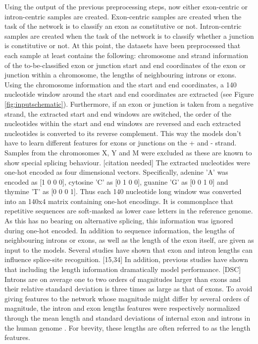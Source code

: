 Using the output of the previous preprocessing steps, now either exon-centric or intron-centric samples are created. Exon-centric samples are created when the task of the network is to classify an exon as constitutive or not. Intron-centric samples are created when the task of the network is to classify whether a junction is constitutive or not.
At this point, the datasets have been preprocessed that each sample at least contains the following:
chromosome and strand information of the to-be-classified exon or junction
start and end coordinates of the exon or junction within a chromosome,
the lengths of neighbouring introns or exons.
Using the chromosome information and the start and end coordinates, a 140 nucleotide window around the start and end coordinates are extracted (see Figure \ref{fig:inputschematic}). Furthermore, if an exon or junction is taken from a negative strand, the extracted start and end windows are switched, the order of the nucleotides within the start and end windows are reversed and each extracted nucleotides is converted to its reverse complement. This way the models don't have to learn different features for exons or junctions on the + and - strand.
Samples from the chromosomes X, Y and M were excluded as these are known to show special splicing behaviour. [citation needed]
The extracted nucleotides were one-hot encoded as four dimensional vectors. Specifically, adenine 'A' was encoded as [1 0 0 0], cytosine 'C' as [0 1 0 0], guanine 'G' as [0 0 1 0] and thymine 'T' as [0 0 0 1]. Thus each 140 nucleotide long window was converted into an 140x4 matrix containing one-hot encodings.
It is commonplace that repetitive sequences are soft-masked as lower case letters in the reference genome. As this has no bearing on alternative splicing, this information was ignored during one-hot encoded.
In addition to sequence information, the lengths of neighbouring introns or exons, as well as the length of the exon itself, are given as input to the models. Several studies have shown that exon and intron lengths can influence splice-site recognition. [15,34] In addition, previous studies have shown that including the length information dramatically model performance. [DSC] Introns are on average one to two orders of magnitudes larger than exons and their relative standard deviation is three times as large as that of exons. To avoid giving features to the network whose magnitude might differ by several orders of magnitude, the intron and exon lengths features were respectively normalized through the mean length and standard deviations of internal exon and introns in the human genome \cite{exonintronlens}. For brevity, these lengths are often referred to as the length features.
